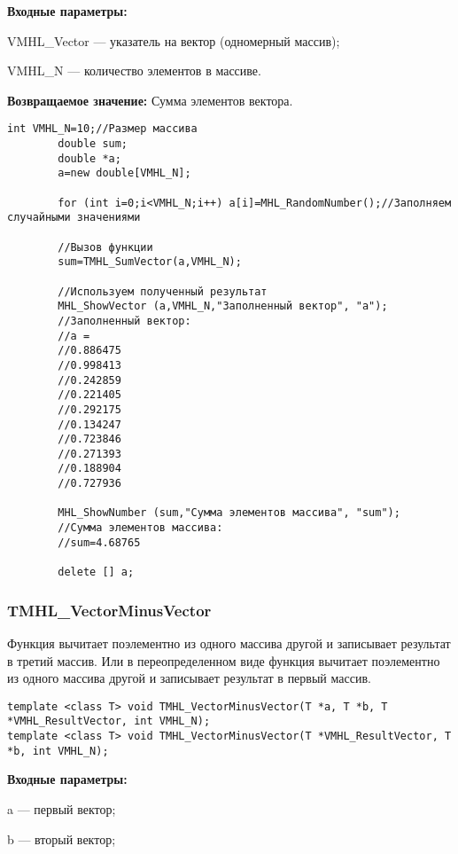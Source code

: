 \documentclass[a4paper,12pt]{article}
\begin{document}
\textbf{Входные параметры:}

 VMHL\_Vector --- указатель на вектор (одномерный массив);
 
 VMHL\_N --- количество элементов в массиве.

\textbf{Возвращаемое значение:}
Сумма элементов вектора.


\begin{lstlisting}[label=code_use_TMHL_SumVector,caption=Пример использования]
        int VMHL_N=10;//Размер массива
        double sum;
        double *a;
        a=new double[VMHL_N];

        for (int i=0;i<VMHL_N;i++) a[i]=MHL_RandomNumber();//Заполняем случайными значениями

        //Вызов функции
        sum=TMHL_SumVector(a,VMHL_N);

        //Используем полученный результат
        MHL_ShowVector (a,VMHL_N,"Заполненный вектор", "a");
        //Заполненный вектор:
        //a =
        //0.886475
        //0.998413
        //0.242859
        //0.221405
        //0.292175
        //0.134247
        //0.723846
        //0.271393
        //0.188904
        //0.727936

        MHL_ShowNumber (sum,"Сумма элементов массива", "sum");
        //Сумма элементов массива:
        //sum=4.68765

        delete [] a;
\end{lstlisting}

\subsubsection{TMHL\_VectorMinusVector}\label{TMHL_VectorMinusVector}

Функция вычитает поэлементно из одного массива другой и записывает результат в третий массив. Или в переопределенном виде функция вычитает поэлементно из одного массива другой и записывает результат в первый массив.


\begin{lstlisting}[label=code_syntax_TMHL_VectorMinusVector,caption=Синтаксис]
template <class T> void TMHL_VectorMinusVector(T *a, T *b, T *VMHL_ResultVector, int VMHL_N);
template <class T> void TMHL_VectorMinusVector(T *VMHL_ResultVector, T *b, int VMHL_N);
\end{lstlisting}

\textbf{Входные параметры:}

  a --- первый вектор;
  
 b --- вторый вектор;
 
\end{document}
